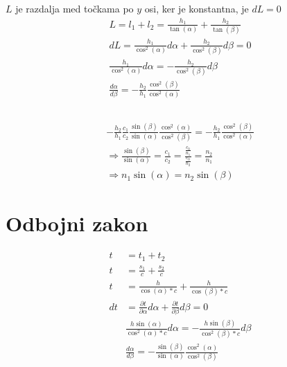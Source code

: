 \documentclass[a4paper,12pt]{article}
\begin{document}
\subsection{}
$L$ je razdalja med točkama po $y$ osi, ker je konstantna, je $dL = 0$
\begin{align}
    L = l_1 + l_2 = \frac{h_1}{\tan(\alpha)} + \frac{h_2}{\tan(\beta)}             \\
    dL = \frac{h_1}{\cos^2(\alpha)} d\alpha + \frac{h_2}{\cos^2(\beta)} d\beta = 0 \\
    \frac{h_1}{\cos^2(\alpha)} d\alpha = -\frac{h_2}{\cos^2(\beta)} d\beta         \\
    \frac{d \alpha}{d \beta} = -\frac{h_2}{h_1} \frac{\cos^2(\beta)}{\cos^2(\alpha)}
\end{align}

\subsection{}
\begin{align}
    -\frac{h_2}{h_1} \frac{c_1}{c_2} \frac{\sin(\beta)}{\sin(\alpha)} \frac{\cos^2(\alpha)}{\cos^2(\beta)} = - \frac{h_2}{h_1} \frac{\cos^2(\beta)}{\cos^2(\alpha)} \\
    \Rightarrow \frac{\sin(\beta)}{\sin(\alpha)} = \frac{c_1}{c_2} = \frac{\frac{c_0}{n_1}}{\frac{c_0}{n_2}} = \frac{n_2}{n_1}                                      \\
    \Rightarrow n_1 \sin(\alpha) = n_2 \sin(\beta)
\end{align}

\section{Odbojni zakon} \label{sec:odbojni_zakon}
\begin{align}
    t  & = t_1 + t_2                                                                                         \\
    t  & = \frac{s_1}{c} + \frac{s_2}{c}                                                                     \\
    t  & = \frac{h}{\cos(\alpha) * c} + \frac{h}{\cos(\beta) * c}                                            \\
    dt & = \frac{\partial t}{\partial \alpha} d\alpha + \frac{\partial t}{\partial \beta} d\beta = 0         \\
       & \frac{h \sin(\alpha)}{\cos^2(\alpha) * c} d\alpha = -\frac{h \sin(\beta)}{\cos^2(\beta) * c} d\beta \\
       & \frac{d \alpha}{d \beta} = -\frac{\sin(\beta)}{\sin(\alpha)} \frac{\cos^2(\alpha)}{\cos^2(\beta)}
\end{align}
\end{document}
